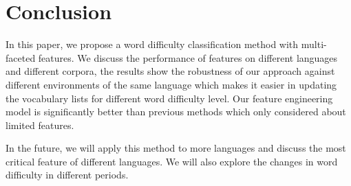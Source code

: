 \section{Conclusion}
\label{sec:conclude}

In this paper, we propose a word difficulty classification method with multi-faceted features.
We discuss the performance of features on different languages and different corpora, the results show the robustness of our approach against different environments of the same language which makes it easier in updating the vocabulary lists for different word difficulty level.
Our feature engineering model is significantly better than previous  methods which only considered about limited features.


In the future, we will apply this method to more languages and discuss the most critical feature of different languages.
We will also explore the changes in word difficulty in different periods.
